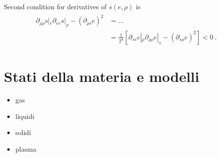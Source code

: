 \documentclass[letterpaper,10pt,english]{jupyterBook}
\begin{document}
\sphinxAtStartPar
Second condition for derivatives of \(s(e, \rho)\) is
\begin{equation*}
\begin{split}\begin{aligned}
  \partial_{\rho \rho} s|_{e} \partial_{ee} s |_{\rho} - \left( \partial_{\rho s} e \right)^2 
  & = \dots \\
  & = \frac{1}{T^4} \left[ \partial_{ss} e|_{\rho} \partial_{\rho \rho} e|_{s} - \left( \partial_{s \rho} e \right)^2  \right] < 0 \ .
\end{aligned} \end{split}
\end{equation*}


\sphinxstepscope




\chapter{Stati della materia e modelli}
\label{\detokenize{ch/media:stati-della-materia-e-modelli}}\label{\detokenize{ch/media:classical-thermodynamics-media}}\label{\detokenize{ch/media::doc}}
\sphinxAtStartPar
{}
\begin{itemize}
\item {} 
\sphinxAtStartPar
gas

\item {} 
\sphinxAtStartPar
liquidi

\item {} 
\sphinxAtStartPar
solidi

\item {} 
\sphinxAtStartPar
plasma

\end{itemize}
\end{document}
